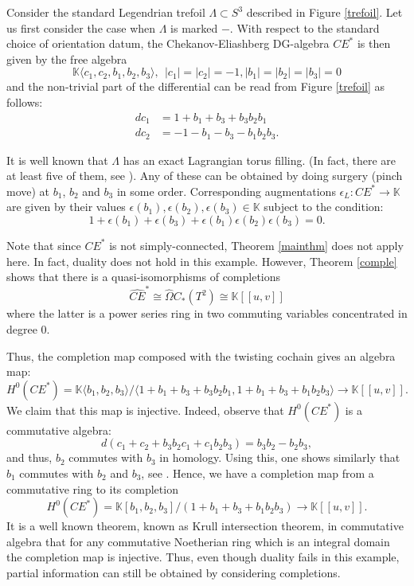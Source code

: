 \documentclass{gtpart}
\newcommand{\K}{\mathbb{K}}
\begin{document}
Consider the standard Legendrian trefoil $\Lambda \subset S^{3}$ described in Figure
\ref{trefoil}. Let us first consider the case when $\Lambda$ is marked $-$. With respect to the standard choice of orientation datum, the
Chekanov-Eliashberg DG-algebra $CE^{\ast}$ is then given by the free algebra
\[ \mathbb{K} \langle c_1, c_2, b_1,b_2,b_3 \rangle, \ \ |c_1|=|c_2|=-1, |b_{1}|=|b_{2}|=|b_{3}|=0 \]
and the non-trivial part of the differential can be read from Figure \ref{trefoil} as follows: 
\begin{align*}
    dc_1 &= 1 + b_{1} + b_{3} + b_{3}b_{2}b_{1} \\
    dc_2 &=-1 - b_{1} - b_{3} - b_{1}b_{2}b_{3}. 
\end{align*}

It is well known that $\Lambda$ has an exact Lagrangian torus filling. (In fact, there are at least
five of them, see \cite{EKH}).  Any of these can be obtained by doing surgery (pinch move) at
$b_1$, $b_2$ and $b_3$ in some order. Corresponding augmentations $\epsilon_L\colon CE^* \to \K$ are given by their values
$\epsilon(b_{1}), \epsilon(b_{2}), \epsilon(b_{3}) \in \K$ subject to the condition:
\[ 
1+ \epsilon(b_{1}) + \epsilon(b_{3}) + \epsilon(b_{1}) \epsilon(b_{2}) \epsilon(b_{3})  =0.   
\]

Note that since $CE^*$ is not simply-connected, Theorem \ref{mainthm} does not apply 
here. In fact, duality does not hold in this example. However, Theorem
\ref{comple} shows that there is a quasi-isomorphisms of completions  
\[
\widehat{CE}^* \cong \widehat{\Omega} C_*(T^2) \cong \K [[u, v]] 
\] 
where the latter is a power series ring in two commuting variables concentrated in degree 0. 

Thus, the completion map composed with the twisting cochain gives an algebra map: 
\[ 
H^0(CE^*) = \K \langle b_{1},b_{2},b_{3} \rangle / \langle 1+b_{1}+b_{3}+b_{3}b_{2}b_{1} ,
1+b_{1}+b_{3}+b_{1}b_{2}b_{3} \rangle   \to \K[[u,v]]. \] 
We claim that this map is injective. Indeed, observe that $H^0(CE^*)$ is a commutative
algebra: 
\[ 
d( c_1 + c_2 + b_{3}b_{2} c_1 + c_1 b_{2}b_{3}) = b_{3}b_{2} - b_{2}b_{3}, 
\]
and thus, $b_{2}$ commutes with $b_{3}$ in homology. Using this, one shows similarly that $b_{1}$ commutes with $b_{2}$ and $b_{3}$, see \cite{CaMu}. 
Hence, we have a completion map from a commutative ring to its completion
\[ 
H^0(CE^*) = \K [b_{1},b_{2},b_{3}] / (1+b_{1}+b_{3}+b_{1}b_{2}b_{3}) \to \K[[u,v]]. 
\]
It is a well known theorem, known as Krull intersection theorem, 
in commutative algebra that for any commutative Noetherian ring which is an
integral domain the completion map is injective. Thus, even though duality fails in this example, partial information can still be obtained by considering completions.
\end{document}
